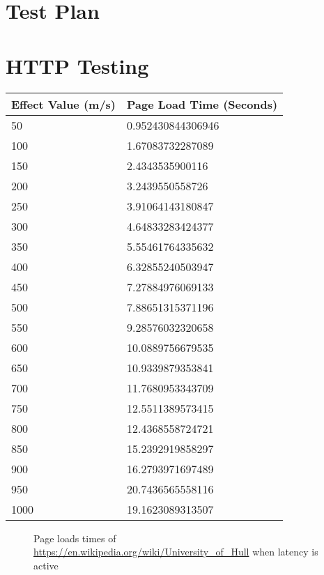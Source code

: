 \begin{appendices}

%
\chapter{Test Plan}
\label{ref:testplan}


\chapter{HTTP Testing}
\label{ref:httpTesting}


\begin{tabular}{| l | l |}
	\hline
	{\bf Effect Value (m/s)} & {\bf Page Load Time (Seconds)} \\\hline
	50					& 0.952430844306946	 \\\hline
    100					& 1.67083732287089 \\\hline
	150 				& 2.4343535900116 \\\hline
	200					& 3.2439550558726 \\\hline
	250					& 3.91064143180847\\\hline
	300 				& 4.64833283424377\\\hline
	350					& 5.55461764335632\\\hline
	400					& 6.32855240503947\\\hline
	450					& 7.27884976069133\\\hline
	500					& 7.88651315371196\\\hline
	550					& 9.28576032320658\\\hline
	600					& 10.0889756679535\\\hline
	650					& 10.9339879353841\\\hline
	700					& 11.7680953343709\\\hline
	750					& 12.5511389573415\\\hline
	800					& 12.4368558724721\\\hline
	850					& 15.2392919858297\\\hline
	900 				& 16.2793971697489\\\hline
	950					& 20.7436565558116\\\hline
	1000				& 19.1623089313507\\\hline
\end{tabular}
\begin{figure}[h]
	\caption{Page loads times of \url{https://en.wikipedia.org/wiki/University_of_Hull} when latency is active}
	\label{ref:latencyHttp}
\end{figure}


\end{appendices}
